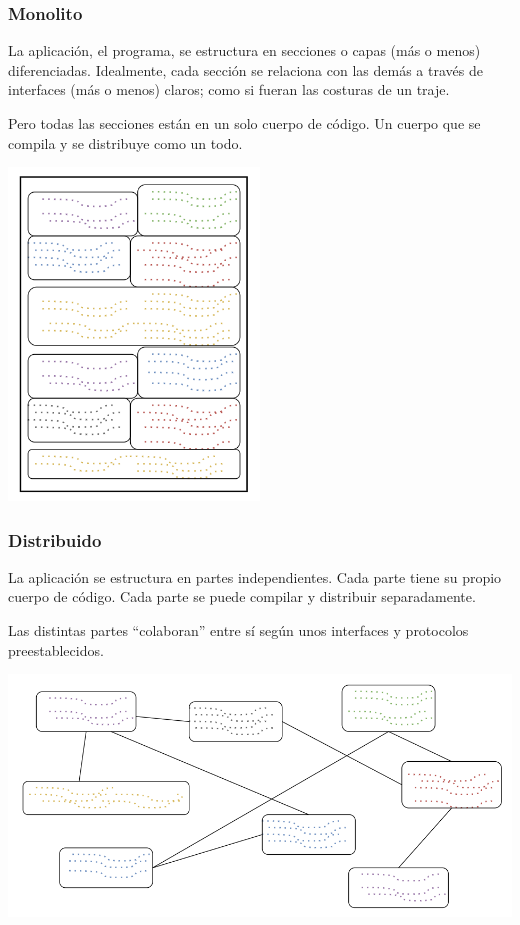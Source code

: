 \documentclass[spanish,12pt,a4paper,final,oneside]{book}
\begin{document}
\subsubsection{Monolito}

La aplicación, el programa, se estructura en secciones o capas (más o menos) diferenciadas. Idealmente, cada sección se relaciona con las demás a través de interfaces (más o menos) claros; como si fueran las costuras de un traje.

Pero todas las secciones están en un solo cuerpo de código. Un cuerpo que se compila y se distribuye como un todo. 

\begin{center}
\includegraphics[width=0.5\textwidth]{arquitectura - monolito}
\end{center}

\subsubsection{Distribuido}

La aplicación se estructura en partes independientes. Cada parte tiene su propio cuerpo de código. Cada parte se puede compilar y distribuir separadamente.

Las distintas partes ``colaboran'' entre sí según unos interfaces y protocolos preestablecidos.

\includegraphics[width=\textwidth]{arquitectura - distribuido}
\end{document}
